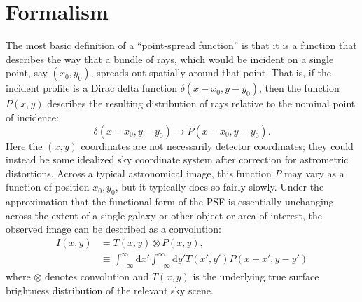 \documentclass{aastex63}
\newcommand{\irresponse}[1]{{#1}}
\begin{document}
\section{Formalism}\label{sec:formalism}

The most basic definition of a ``point-spread function'' is that it is a function that describes the way that a bundle of rays, which would be incident on a single point, say $(x_0,y_0)$, spreads out spatially around that point. 
\irresponse{That is, if the incident profile is a Dirac delta function $\delta(x-x_0,y-y_0)$, then} the function $P(x,y)$ describes the resulting distribution of rays relative to the nominal point of incidence:
\begin{equation}
    \delta(x-x_0,y-y_0) \rightarrow P(x-x_0,y-y_0).
\end{equation}
\irresponse{Here the $(x,y)$ coordinates are not necessarily detector coordinates; they could instead be some idealized sky coordinate system after correction for astrometric distortions.}  
Across a typical astronomical image, this function $P$ may vary as a function of position $x_0,y_0$, but it typically does so fairly slowly.  Under the approximation that the functional form of the PSF is essentially unchanging across the extent of a single galaxy or other object or area of interest, the observed image can be described as a convolution:
\begin{align}
I(x,y) &= T(x,y) \otimes P(x,y),\\
&\equiv \int_{-\infty}^{\infty} \mathrm{d}x'
\int_{-\infty}^{\infty} \mathrm{d}y' T(x',y')P(x-x', y-y')
\end{align}
where $\otimes$ denotes convolution and $T(x,y)$ is the underlying true surface brightness distribution of the relevant sky scene.
\end{document}
